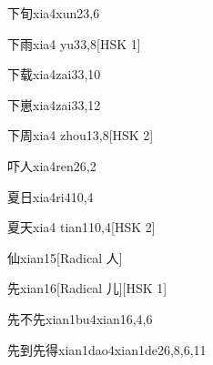 \begin{entry}{下旬}{xia4xun2}{3,6}
\end{entry}

\begin{entry}{下雨}{xia4 yu3}{3,8}[HSK 1]
\end{entry}

\begin{entry}{下载}{xia4zai3}{3,10}
\end{entry}

\begin{entry}{下崽}{xia4zai3}{3,12}
\end{entry}

\begin{entry}{下周}{xia4 zhou1}{3,8}[HSK 2]
\end{entry}

\begin{entry}{吓人}{xia4ren2}{6,2}
\end{entry}

\begin{entry}{夏日}{xia4ri4}{10,4}
\end{entry}

\begin{entry}{夏天}{xia4 tian1}{10,4}[HSK 2]
\end{entry}

\begin{entry}{仙}{xian1}{5}[Radical 人]
\end{entry}

\begin{entry}{先}{xian1}{6}[Radical 儿][HSK 1]
\end{entry}

\begin{entry}{先不先}{xian1bu4xian1}{6,4,6}
\end{entry}

\begin{entry}{先到先得}{xian1dao4xian1de2}{6,8,6,11}
\end{entry}

